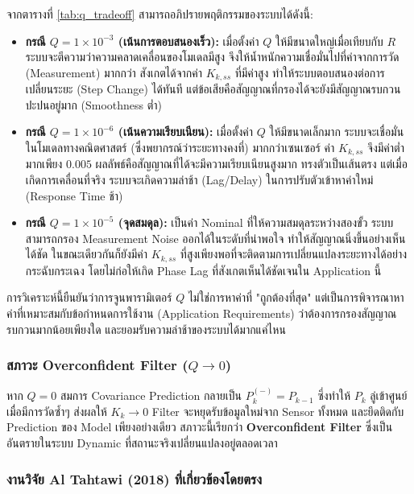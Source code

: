 จากตารางที่ \ref{tab:q_tradeoff} สามารถอภิปรายพฤติกรรมของระบบได้ดังนี้:

\begin{itemize}
    \item \textbf{กรณี $Q = 1 \times 10^{-3}$ (เน้นการตอบสนองเร็ว):} เมื่อตั้งค่า $Q$ ให้มีขนาดใหญ่เมื่อเทียบกับ $R$ ระบบจะตีความว่าความคลาดเคลื่อนของโมเดลมีสูง จึงให้น้ำหนักความเชื่อมั่นไปที่ค่าจากการวัด (Measurement) มากกว่า สังเกตได้จากค่า $K_{k,ss}$ ที่มีค่าสูง ทำให้ระบบตอบสนองต่อการเปลี่ยนระยะ (Step Change) ได้ทันที แต่ข้อเสียคือสัญญาณที่กรองได้จะยังมีสัญญาณรบกวนปะปนอยู่มาก (Smoothness ต่ำ)
    
    \item \textbf{กรณี $Q = 1 \times 10^{-6}$ (เน้นความเรียบเนียน):} เมื่อตั้งค่า $Q$ ให้มีขนาดเล็กมาก ระบบจะเชื่อมั่นในโมเดลทางคณิตศาสตร์ (ซึ่งพยากรณ์ว่าระยะทางคงที่) มากกว่าเซนเซอร์ ค่า $K_{k,ss}$ จึงมีค่าต่ำมากเพียง $0.005$ ผลลัพธ์คือสัญญาณที่ได้จะมีความเรียบเนียนสูงมาก ทรงตัวเป็นเส้นตรง แต่เมื่อเกิดการเคลื่อนที่จริง ระบบจะเกิดความล่าช้า (Lag/Delay) ในการปรับตัวเข้าหาค่าใหม่ (Response Time ช้า)
    
    \item \textbf{กรณี $Q = 1 \times 10^{-5}$ (จุดสมดุล):} เป็นค่า Nominal ที่ให้ความสมดุลระหว่างสองขั้ว ระบบสามารถกรอง Measurement Noise ออกได้ในระดับที่น่าพอใจ ทำให้สัญญาณนิ่งขึ้นอย่างเห็นได้ชัด ในขณะเดียวกันก็ยังมีค่า $K_{k,ss}$ ที่สูงเพียงพอที่จะติดตามการเปลี่ยนแปลงระยะทางได้อย่างกระฉับกระเฉง โดยไม่ก่อให้เกิด Phase Lag ที่สังเกตเห็นได้ชัดเจนใน Application นี้
\end{itemize}

การวิเคราะห์นี้ยืนยันว่าการจูนพารามิเตอร์ $Q$ ไม่ใช่การหาค่าที่ "ถูกต้องที่สุด" แต่เป็นการพิจารณาหาค่าที่เหมาะสมกับข้อกำหนดการใช้งาน (Application Requirements) ว่าต้องการกรองสัญญาณรบกวนมากน้อยเพียงใด และยอมรับความล่าช้าของระบบได้มากแค่ไหน

\subsubsection{สภาวะ Overconfident Filter ($Q \to 0$)}

หาก $Q = 0$ สมการ Covariance Prediction กลายเป็น $P_k^{(-)} = P_{k-1}$
ซึ่งทำให้ $P_k$ ลู่เข้าศูนย์เมื่อมีการวัดซ้ำๆ ส่งผลให้ $K_k \rightarrow 0$
Filter จะหยุดรับข้อมูลใหม่จาก Sensor ทั้งหมด และยึดติดกับ Prediction ของ Model
เพียงอย่างเดียว สภาวะนี้เรียกว่า \textbf{Overconfident Filter}
ซึ่งเป็นอันตรายในระบบ Dynamic ที่สถานะจริงเปลี่ยนแปลงอยู่ตลอดเวลา

\subsubsection{งานวิจัย Al Tahtawi (2018) ที่เกี่ยวข้องโดยตรง}

